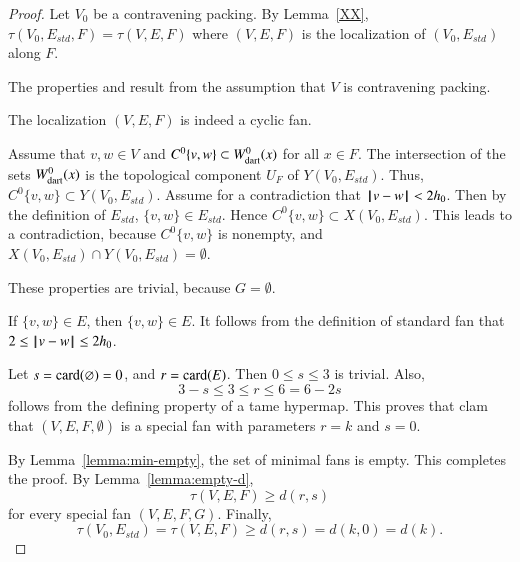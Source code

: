 \begin{proof}
Let $V_0$ be a contravening packing.
By Lemma~\ref{XX}, $\tau(V_0,E_{std},F)=\tau(V,E,F)$  where $(V,E,F)$ is the
localization of
$(V_0,E_{std})$ along $F$. 

  The properties  and
 result from the assumption that $V$ is contravening
packing.  

  The localization $(V,E,F)$ is indeed a cyclic fan.

  Assume that $v,w\in V$ and 
$C^0\{v,w\}\subset W^0_{\text{dart}}(x)$ for all $x\in F$.
The intersection of the sets $W^0_{\text{dart}}(x)$ is the topological component
$U_F$ of $Y(V_0,E_{std})$.  Thus, $C^0\{v,w\}\subset Y(V_0,E_{std})$.
Assume for a contradiction that ${\hskip0.1em|\hskip-0.15em|\hskip0.1em}v - w{\hskip0.1em|\hskip-0.15em|\hskip0.1em}< 2{h_0}$. Then by the definition of $E_{std}$, $\{v,w\}\in E_{std}$.
Hence $C^0\{v,w\}\subset X(V_0,E_{std})$. This leads to a contradiction, because
$C^0\{v,w\}$ is nonempty, and $X(V_0,E_{std})\cap Y(V_0,E_{std})=\emptyset$.

   These properties are trivial, because $G=\emptyset$.

 If $\{v,w\}\in E$, then $\{v,w\}\in E$.  It follows from the definition of
standard fan that $2\le {\hskip0.1em|\hskip-0.15em|\hskip0.1em}v - w{\hskip0.1em|\hskip-0.15em|\hskip0.1em}\le 2{h_0}$.

 Let $s={\operatorname{card}}(\varnothing) = 0$, and $r={\operatorname{card}}(E)$.  Then $0\le s\le 3$ is trivial. Also, 
$$3-s \le 3\le r \le 6=6 - 2s$$
follows from the defining property  of a tame hypermap.  This proves that clam that
$(V,E,F,\emptyset)$ is a special fan with parameters $r=k$ and $s=0$.

By Lemma~\ref{lemma:min-empty}, the set of minimal fans is empty.
This completes the proof.  By Lemma~\ref{lemma:empty-d}, 
$$
\tau(V,E,F) \ge d (r,s)
$$
for every special fan $(V,E,F,G)$. 
Finally, 
$$\tau(V_0,E_{std})=\tau(V,E,F) \ge d(r,s) = d(k,0) = d(k).$$  
\end{proof}


